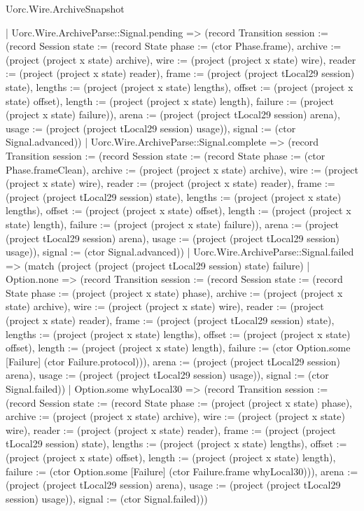 \begin{lexlean}{Uorc.Wire.ArchiveSnapshot}
\begin{semanticmodule}
{        | Uorc.Wire.ArchiveParse::Signal.pending => (record Transition {session := (record Session {state := (record State {phase := (ctor Phase.frame), archive := (project (project x state) archive), wire := (project (project x state) wire), reader := (project (project x state) reader), frame := (project (project tLocal29 session) state), lengths := (project (project x state) lengths), offset := (project (project x state) offset), length := (project (project x state) length), failure := (project (project x state) failure)}), arena := (project (project tLocal29 session) arena), usage := (project (project tLocal29 session) usage)}), signal := (ctor Signal.advanced)})
        | Uorc.Wire.ArchiveParse::Signal.complete => (record Transition {session := (record Session {state := (record State {phase := (ctor Phase.frameClean), archive := (project (project x state) archive), wire := (project (project x state) wire), reader := (project (project x state) reader), frame := (project (project tLocal29 session) state), lengths := (project (project x state) lengths), offset := (project (project x state) offset), length := (project (project x state) length), failure := (project (project x state) failure)}), arena := (project (project tLocal29 session) arena), usage := (project (project tLocal29 session) usage)}), signal := (ctor Signal.advanced)})
        | Uorc.Wire.ArchiveParse::Signal.failed => (match (project (project (project tLocal29 session) state) failure)
          | Option.none => (record Transition {session := (record Session {state := (record State {phase := (project (project x state) phase), archive := (project (project x state) archive), wire := (project (project x state) wire), reader := (project (project x state) reader), frame := (project (project tLocal29 session) state), lengths := (project (project x state) lengths), offset := (project (project x state) offset), length := (project (project x state) length), failure := (ctor Option.some [Failure] (ctor Failure.protocol))}), arena := (project (project tLocal29 session) arena), usage := (project (project tLocal29 session) usage)}), signal := (ctor Signal.failed)})
          | Option.some whyLocal30 => (record Transition {session := (record Session {state := (record State {phase := (project (project x state) phase), archive := (project (project x state) archive), wire := (project (project x state) wire), reader := (project (project x state) reader), frame := (project (project tLocal29 session) state), lengths := (project (project x state) lengths), offset := (project (project x state) offset), length := (project (project x state) length), failure := (ctor Option.some [Failure] (ctor Failure.frame whyLocal30))}), arena := (project (project tLocal29 session) arena), usage := (project (project tLocal29 session) usage)}), signal := (ctor Signal.failed)}))
}
\end{semanticmodule}
\end{lexlean}
